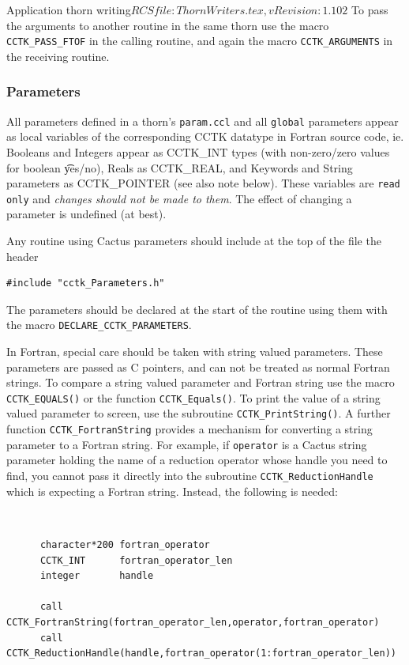 \begin{cactuspart}{2}{Application thorn writing}{$RCSfile: ThornWriters.tex,v $}{$Revision: 1.102 $}
To pass the arguments to another routine in the same thorn use the macro
{\tt CCTK\_PASS\_FTOF} in the calling routine, and again the macro
{\tt CCTK\_ARGUMENTS} in the receiving routine.


\subsubsection{Parameters}

All parameters defined in a thorn's {\tt param.ccl} and all {\tt global}
parameters appear as local variables of the corresponding CCTK datatype
in Fortran source code, ie. Booleans and Integers appear as CCTK\_INT types
(with non-zero/zero values for boolean {\t yes/no}),
Reals as CCTK\_REAL, and Keywords and String parameters as CCTK\_POINTER (see
also note below). These variables are {\tt read only} and {\em changes should
not be made to them}. The effect of changing a parameter is undefined (at best).

Any routine using Cactus parameters should include at
the top of the file the header
\begin{verbatim}
#include "cctk_Parameters.h"
\end{verbatim}

The parameters should be declared at the start of the routine
using them with the macro {\tt DECLARE\_CCTK\_PARAMETERS}.

In Fortran, special care should be taken with string valued parameters.
These parameters are passed as C pointers, and can not be treated as
normal Fortran strings. 
To compare a string valued parameter and Fortran
string use the macro {\tt CCTK\_EQUALS()} or the function {\tt CCTK\_Equals()}.
To print the value of a string valued parameter to screen, use the subroutine
{\tt CCTK\_PrintString()}. A further function {\tt CCTK\_FortranString} 
provides a mechanism for converting a string parameter to a Fortran string. 
For example, if {\tt operator} is a Cactus string parameter holding the name of a reduction operator whose handle you need to find, you cannot pass it 
directly into the subroutine {\tt CCTK\_ReductionHandle} which is expecting 
a Fortran string. Instead, the following is needed:
{\tt
\begin{verbatim}
      character*200 fortran_operator
      CCTK_INT      fortran_operator_len
      integer       handle

      call CCTK_FortranString(fortran_operator_len,operator,fortran_operator)
      call CCTK_ReductionHandle(handle,fortran_operator(1:fortran_operator_len))
\end{verbatim}
}




\end{cactuspart}
